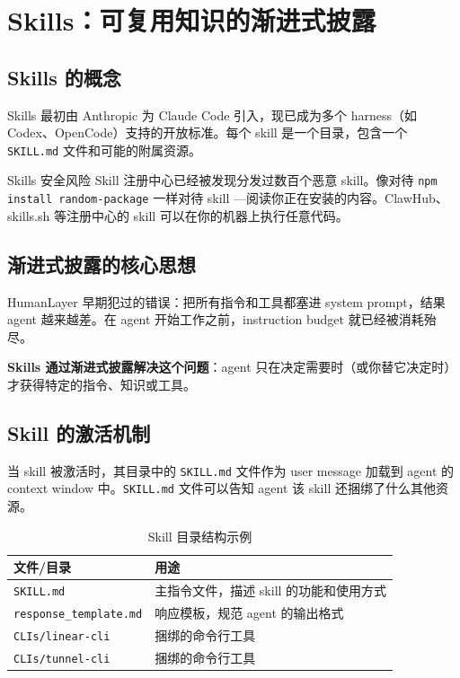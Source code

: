 \section{Skills：可复用知识的渐进式披露}

\subsection{Skills 的概念}

Skills 最初由 Anthropic 为 Claude Code 引入，现已成为多个 harness（如 Codex、OpenCode）支持的开放标准。每个 skill 是一个目录，包含一个 \texttt{SKILL.md} 文件和可能的附属资源。

\begin{warningbox}{Skills 安全风险}
Skill 注册中心已经被发现分发过数百个恶意 skill。像对待 \texttt{npm install random-package} 一样对待 skill ---阅读你正在安装的内容。ClawHub、skills.sh 等注册中心的 skill 可以在你的机器上执行任意代码。
\end{warningbox}

\subsection{渐进式披露的核心思想}

HumanLayer 早期犯过的错误：把所有指令和工具都塞进 system prompt，结果 agent 越来越差。在 agent 开始工作之前，instruction budget 就已经被消耗殆尽。

\textbf{Skills 通过渐进式披露解决这个问题}：agent 只在决定需要时（或你替它决定时）才获得特定的指令、知识或工具。

\subsection{Skill 的激活机制}

当 skill 被激活时，其目录中的 \texttt{SKILL.md} 文件作为 user message 加载到 agent 的 context window 中。\texttt{SKILL.md} 文件可以告知 agent 该 skill 还捆绑了什么其他资源。

\begin{table}[H]
\centering
\caption{Skill 目录结构示例}
\begin{tabular}{@{}ll@{}}
\toprule
\textbf{文件/目录} & \textbf{用途} \\
\midrule
\texttt{SKILL.md} & 主指令文件，描述 skill 的功能和使用方式 \\
\texttt{response\_template.md} & 响应模板，规范 agent 的输出格式 \\
\texttt{CLIs/linear-cli} & 捆绑的命令行工具 \\
\texttt{CLIs/tunnel-cli} & 捆绑的命令行工具 \\
\bottomrule
\end{tabular}
\end{table}

